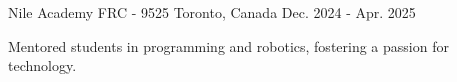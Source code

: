 

\begin{cventries}

\cventry
  {Nile Academy} %
  {FRC - 9525} %
  {Toronto, Canada} %
  {Dec. 2024 - Apr. 2025} %
  {
    \begin{cvitems} %
      \item {Mentored students in programming and robotics, fostering a passion for technology.}
    \end{cvitems}
  }

\end{cventries}